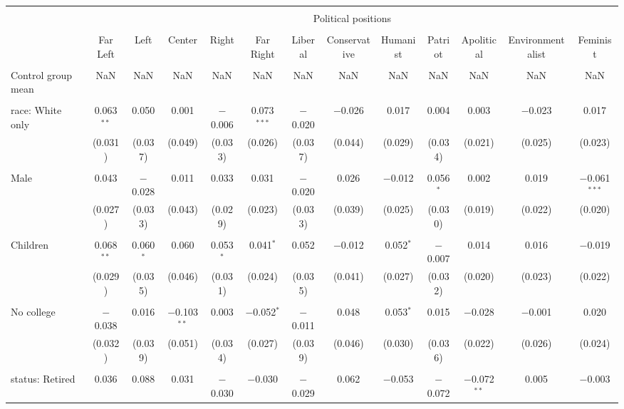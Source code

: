 
\begin{tabular}{@{\extracolsep{5pt}}lcccccccccccc} 
\\[-1.8ex]\hline 
\hline \\[-1.8ex] 
 & \multicolumn{12}{c}{Political positions} \\ 
\cline{2-13} 
\\[-1.8ex] & Far Left & Left & Center & Right & Far Right & Liberal & Conservative & Humanist & Patriot & Apolitical & Environmentalist & Feminist \\ 
\hline \\[-1.8ex] 
 Control group mean & NaN & NaN & NaN & NaN & NaN & NaN & NaN & NaN & NaN & NaN & NaN & NaN  \\ \hline \\[-1.8ex] race: White only & 0.063$^{**}$ & 0.050 & 0.001 & $-$0.006 & 0.073$^{***}$ & $-$0.020 & $-$0.026 & 0.017 & 0.004 & 0.003 & $-$0.023 & 0.017 \\ 
  & (0.031) & (0.037) & (0.049) & (0.033) & (0.026) & (0.037) & (0.044) & (0.029) & (0.034) & (0.021) & (0.025) & (0.023) \\ 
  & & & & & & & & & & & & \\ 
 Male & 0.043 & $-$0.028 & 0.011 & 0.033 & 0.031 & $-$0.020 & 0.026 & $-$0.012 & 0.056$^{*}$ & 0.002 & 0.019 & $-$0.061$^{***}$ \\ 
  & (0.027) & (0.033) & (0.043) & (0.029) & (0.023) & (0.033) & (0.039) & (0.025) & (0.030) & (0.019) & (0.022) & (0.020) \\ 
  & & & & & & & & & & & & \\ 
 Children & 0.068$^{**}$ & 0.060$^{*}$ & 0.060 & 0.053$^{*}$ & 0.041$^{*}$ & 0.052 & $-$0.012 & 0.052$^{*}$ & $-$0.007 & 0.014 & 0.016 & $-$0.019 \\ 
  & (0.029) & (0.035) & (0.046) & (0.031) & (0.024) & (0.035) & (0.041) & (0.027) & (0.032) & (0.020) & (0.023) & (0.022) \\ 
  & & & & & & & & & & & & \\ 
 No college & $-$0.038 & 0.016 & $-$0.103$^{**}$ & 0.003 & $-$0.052$^{*}$ & $-$0.011 & 0.048 & 0.053$^{*}$ & 0.015 & $-$0.028 & $-$0.001 & 0.020 \\ 
  & (0.032) & (0.039) & (0.051) & (0.034) & (0.027) & (0.039) & (0.046) & (0.030) & (0.036) & (0.022) & (0.026) & (0.024) \\ 
  & & & & & & & & & & & & \\ 
 status: Retired & 0.036 & 0.088 & 0.031 & $-$0.030 & $-$0.030 & $-$0.029 & 0.062 & $-$0.053 & $-$0.072 & $-$0.072$^{**}$ & 0.005 & $-$0.003 \\ 

\end{tabular}
